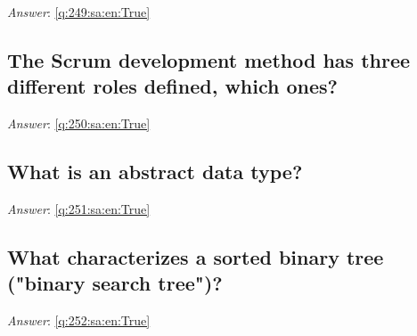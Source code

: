 \documentclass[a4paper,11pt,oneside]{article}
\begin{document}
\begin{sloppypar}
\vspace{2cm}

\noindent\makebox[\textwidth]{\hrulefill}

\vspace{1cm}

\textit{Answer}: \autoref{q:249:sa:en:True}



\subsection{The Scrum development method has three different roles defined, which ones?}

\label{q:250:sa:en:False}

\vspace{2cm}

\noindent\makebox[\textwidth]{\hrulefill}

\vspace{1cm}

\textit{Answer}: \autoref{q:250:sa:en:True}



\subsection{What is an abstract data type?}

\label{q:251:sa:en:False}

\vspace{2cm}

\noindent\makebox[\textwidth]{\hrulefill}

\vspace{1cm}

\textit{Answer}: \autoref{q:251:sa:en:True}



\subsection{What characterizes a sorted binary tree ("binary search tree")?}

\label{q:252:sa:en:False}

\vspace{2cm}

\noindent\makebox[\textwidth]{\hrulefill}

\vspace{1cm}

\textit{Answer}: \autoref{q:252:sa:en:True}




\end{sloppypar}
\end{document}
